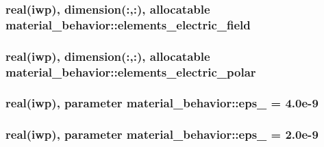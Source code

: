 \subsubsection[{elements\+\_\+electric\+\_\+field}]{\setlength{\rightskip}{0pt plus 5cm}real(iwp), dimension(\+:,\+:), allocatable material\+\_\+behavior\+::elements\+\_\+electric\+\_\+field}\label{classmaterial__behavior_a21b3e10af3e83d240da32039cbbdadd8}
\hypertarget{classmaterial__behavior_aa7c6508ed369f2f37762ce9b6c39c800}{}
\subsubsection[{elements\+\_\+electric\+\_\+polar}]{\setlength{\rightskip}{0pt plus 5cm}real(iwp), dimension(\+:,\+:), allocatable material\+\_\+behavior\+::elements\+\_\+electric\+\_\+polar}\label{classmaterial__behavior_aa7c6508ed369f2f37762ce9b6c39c800}
\hypertarget{classmaterial__behavior_a81d04c6527efb7912c556fabb6e2bfe5}{}
\subsubsection[{eps\+\_\+11}]{\setlength{\rightskip}{0pt plus 5cm}real(iwp), parameter material\+\_\+behavior\+::eps\+\_ = 4.\+0e-\/9}\label{classmaterial__behavior_a81d04c6527efb7912c556fabb6e2bfe5}
\hypertarget{classmaterial__behavior_a0269e4c7b93fc3e0ec2123138e74735b}{}
\subsubsection[{eps\+\_\+33}]{\setlength{\rightskip}{0pt plus 5cm}real(iwp), parameter material\+\_\+behavior\+::eps\+\_ = 2.\+0e-\/9}\label{classmaterial__behavior_a0269e4c7b93fc3e0ec2123138e74735b}
\hypertarget{classmaterial__behavior_a3fca8d5d93d69c99044b5df2cc3dbd17}{}
